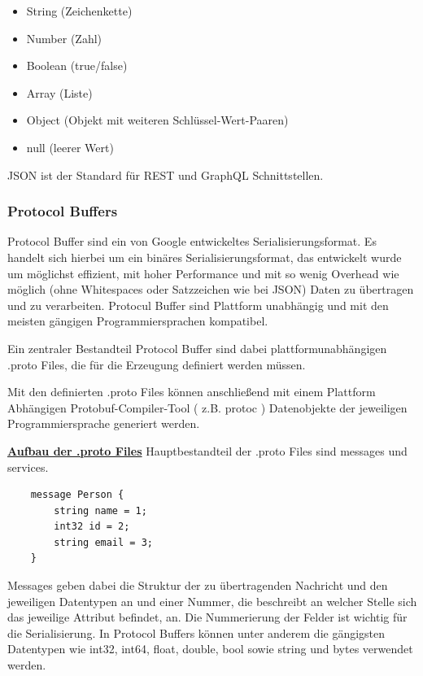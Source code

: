 \begin{itemize}
	\item String (Zeichenkette)
	\item Number (Zahl)
	\item Boolean (true/false)
	\item Array (Liste)
	\item Object (Objekt mit weiteren Schl\"ussel-Wert-Paaren)
	\item null (leerer Wert)
\end{itemize}


JSON ist der Standard für REST und GraphQL Schnittstellen.


\subsubsection{Protocol Buffers}
Protocol Buffer sind ein von Google entwickeltes Serialisierungsformat. Es handelt sich hierbei um ein binäres Serialisierungsformat, das entwickelt wurde um möglichst effizient, mit hoher Performance und mit so wenig Overhead wie möglich (ohne Whitespaces oder Satzzeichen wie bei JSON) Daten zu übertragen und zu verarbeiten. Protocul Buffer sind Plattform unabhängig und mit den meisten gängigen Programmiersprachen kompatibel.

Ein zentraler Bestandteil Protocol Buffer sind dabei plattformunabhängigen .proto Files, die für die Erzeugung definiert werden müssen.

Mit den definierten .proto Files können anschließend mit einem Plattform Abhängigen Protobuf-Compiler-Tool ( z.B. protoc ) Datenobjekte der jeweiligen Programmiersprache generiert werden.


\newpage
\textbf{\underline{Aufbau der .proto Files}}
\newline
Hauptbestandteil der .proto Files sind messages und services.

\begin{verbatim}
	message Person {
		string name = 1;
		int32 id = 2;
		string email = 3;
	}
\end{verbatim}

Messages geben dabei die Struktur der zu übertragenden Nachricht und den jeweiligen Datentypen an und einer Nummer, die beschreibt an welcher Stelle sich das jeweilige Attribut befindet, an. Die Nummerierung der Felder ist wichtig für die Serialisierung.
In Protocol Buffers können unter anderem die gängigsten Datentypen wie int32, int64, float, double, bool sowie string und bytes verwendet werden.

